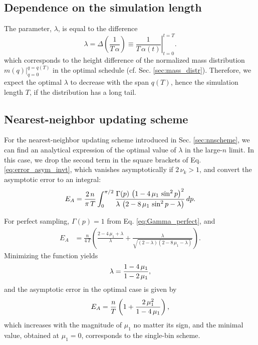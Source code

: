 \documentclass[reprint, floatfix]{revtex4-1}
\newcommand{\Err}{E}
\begin{document}
\subsection{\label{sec:deplength}
Dependence on the simulation length}



The parameter, $\lambda$, is equal to
the difference
$$
  \lambda
  =
  \Delta \left( \frac{ 1 } { T \, \alpha } \right)
  \equiv
  \left.
  \frac { 1 } { T \, \alpha(t) }
  \right|_{t = 0}^{t = T}
  .
$$
which corresponds to the height difference
of the normalized mass distribution
$
\left. m(q) \right|_{q = 0}^{q = q(T)}
$
in the optimal schedule
(cf. Sec. \ref{sec:mass_distr}).
%
Therefore, we expect the optimal $\lambda$
to decrease with the span $q(T)$,
hence the simulation length $T$,
if the distribution has a long tail.




\subsection{Nearest-neighbor updating scheme}


For the nearest-neighbor updating scheme
introduced in Sec. \ref{sec:nnscheme},
we can find an analytical expression
of the optimal value of $\lambda$
in the large-$n$ limit.
%
In this case,
we
drop the second term in the square brackets
of Eq. \eqref{eq:error_asym_invt},
which vanishes asymptotically if $2 \, \nu_k > 1$,
and convert the asymptotic error
to an integral:
%
\begin{align}
\Err_A
=
\frac{2 \, n}{\pi \, T}
\int_0^{\pi/2}
  \frac{ \Gamma(p) \, \left(1 - 4 \, \mu_1 \, \sin^2 p \right)^2    }
       {   \lambda \, \left(2 - 8 \, \mu_1 \, \sin^2 p - \lambda \right) }
\, dp.
\notag
\end{align}



For perfect sampling,
$\Gamma(p) = 1$ from Eq. \eqref{eq:Gamma_perfect},
and
$$
\begin{aligned}
  \Err_A
  &=
  \frac{n}{4 \, T}
  \left(
    \frac{2 - 4 \, \mu_1 + \lambda}{ \lambda }
    +
    \frac{ \lambda }
    { \sqrt{ (2 - \lambda) (2 - 8 \, \mu_1 - \lambda) } }
  \right)
.
\end{aligned}
$$
%
Minimizing the function yields
%
\begin{equation}
  \lambda
  =
  \frac{ 1 - 4 \, \mu_1 }
       { 1 - 2 \, \mu_1 }
  ,
\notag
\end{equation}
%
and the asymptotic error in the optimal case is given by
%
\begin{equation}
  \Err_A
  =
  \frac{n}{T}
  \left(
    1+ \frac{2 \, \mu_1^2}{1-4 \, \mu_1}
  \right)
  ,
\notag
\end{equation}
%
which
increases with the magnitude of $\mu_1$
no matter its sign,
and the minimal value, obtained at $\mu_1 = 0$,
corresponds to the single-bin scheme.
%
\end{document}
